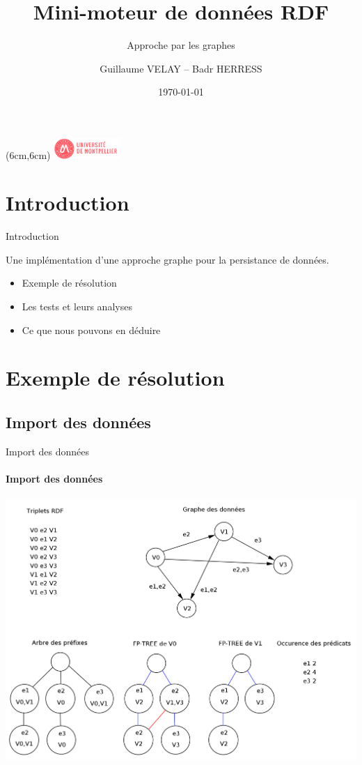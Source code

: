 \documentclass[french]{beamer}
\title[Moteur RDF]{Mini-moteur de données RDF}
\subtitle{Approche par les graphes}
\author[VELAY, HERRESS]{Guillaume VELAY -- Badr HERRESS}
\institute[UM]{\color{white} Université de Montpellier}
\date{\today}
\begin{document}
\begin{frame}
  \titlepage
  \begin{textblock*}{10mm}(6cm,6cm)
    \includegraphics[width=25mm]{images/logo_um.png}
  \end{textblock*}
\end{frame}

\section[Introduction]{Introduction}

\begin{frame}{Introduction}
  
  Une implémentation d’une approche graphe pour la persistance de données.\\
  \begin{itemize}
  \item Exemple de résolution
  \item Les tests et leurs analyses
  \item Ce que nous pouvons en déduire
  \end{itemize}

\end{frame}

\section[Exemple de résolution]{Exemple de résolution}

\subsection[Import des données]{Import des données}

\begin{frame}{Import des données}
  \framesubtitle{Import des données}
  
  \includegraphics[scale=0.7]{images/import.png}

\end{frame}
\end{document}
